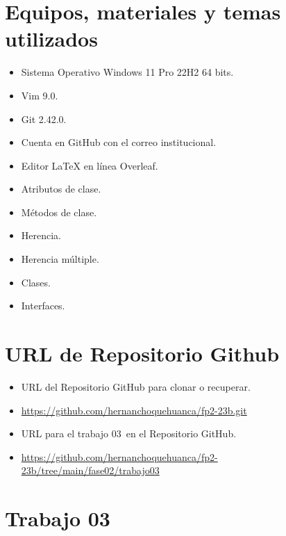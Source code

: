 \documentclass{article}
\newcommand{\itemPracticeNumber}{03}
\begin{document}
\newpage

\section{Equipos, materiales y temas utilizados}
	\begin{itemize}
		\item Sistema Operativo Windows 11 Pro 22H2 64 bits.
		\item Vim 9.0.
		\item Git 2.42.0.
		\item Cuenta en GitHub con el correo institucional.
        \item Editor LaTeX en línea Overleaf.
        \item Atributos de clase.
        \item Métodos de clase.
        \item Herencia.
        \item Herencia múltiple.
        \item Clases.
        \item Interfaces.
        
        
	\end{itemize}
	
\section{URL de Repositorio Github}
	\begin{itemize}
		\item URL del Repositorio GitHub para clonar o recuperar.
        \item \url{https://github.com/hernanchoquehuanca/fp2-23b.git}
		\item URL para el trabajo \itemPracticeNumber\ en el Repositorio GitHub.
		\item \url{https://github.com/hernanchoquehuanca/fp2-23b/tree/main/fase02/trabajo03}
	\end{itemize}

\newpage
 
\section{Trabajo \itemPracticeNumber}
        
        
\end{document}
